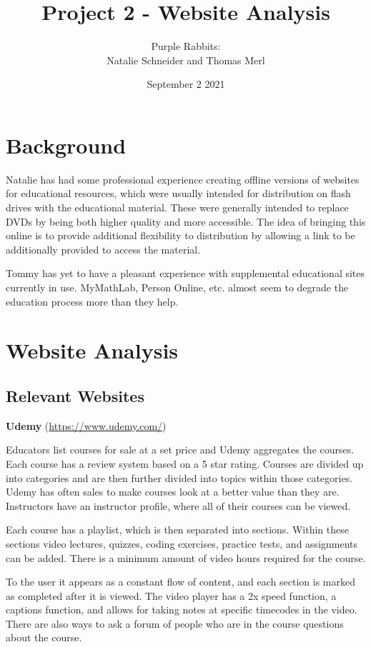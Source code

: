 \documentclass{article}
\title{Project 2 - Website Analysis}
\author{Purple Rabbits:\\Natalie Schneider and Thomas Merl}
\date{September 2 2021}
\begin{document}
\maketitle

\section{Background}

Natalie has had some professional experience creating offline versions of websites for educational resources, which were usually intended for distribution on flash drives with the educational material. These were generally intended to replace DVDs by being both higher quality and more accessible. The idea of bringing this online is to provide additional flexibility to distribution by allowing a link to be additionally provided to access the material.\vspace{\baselineskip}

Tommy has yet to have a pleasant experience with supplemental educational sites currently in use. MyMathLab, Person Online, etc. almost seem to degrade the education process more than they help.

\section{Website Analysis}
\subsection{Relevant Websites}
    
\textbf{Udemy} (\url{https://www.udemy.com/})

Educators list courses for sale at a set price and Udemy aggregates the courses. Each course has a review system based on a 5 star rating. Courses are divided up into categories and are then further divided into topics within those categories. Udemy has often sales to make courses look at a better value than they are. Instructors have an instructor profile, where all of their courses can be viewed.

Each course has a playlist, which is then separated into sections. Within these sections video lectures, quizzes, coding exercises, practice tests, and assignments can be added. There is a minimum amount of video hours required for the course.

To the user it appears as a constant flow of content, and each section is marked as completed after it is viewed. The video player has a 2x speed function, a captions function, and allows for taking notes at specific timecodes in the video. There are also ways to ask a forum of people who are in the course questions about the course. \vspace{\baselineskip}
\end{document}
